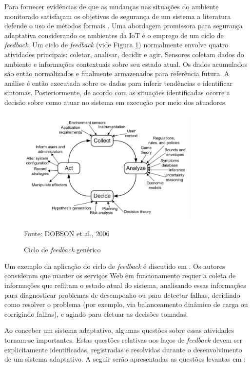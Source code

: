 \documentclass[tid,table]{texufpel} %
\begin{document}
Para fornecer evidências de que as mudanças nas situações do ambiente monitorado satisfaçam os objetivos de segurança de um sistema a literatura defende o uso de métodos formais \cite{lamprecht12, aman15}. Uma abordagem promissora para segurança adaptativa considerando os ambientes da IoT é o emprego de um ciclo de \textit{feedback}. Um ciclo de \textit{feedback} (vide Figura \ref{generic-feedback-loop}) normalmente envolve quatro atividades principais: coletar, analisar, decidir e agir. Sensores coletam dados do ambiente e informações contextuais sobre seu estado atual. Os dados acumulados são então normalizados e finalmente armazenados para referência futura.  A análise é então executada sobre os dados para inferir tendências e identificar sintomas. Posteriormente, de acordo com as situações identificadas ocorre a decisão sobre como atuar no sistema em execução por meio dos atuadores. 

\begin{figure}[ht]
\centering
\includegraphics[width=0.8\textwidth]{imagens/generic-feedback-loop.png}
\caption{Ciclo de \textit{feedback} genérico}
\label{generic-feedback-loop}
Fonte: DOBSON et al., 2006\nocite{dobson06}
\end{figure}

Um exemplo da aplicação do ciclo de \textit{feedback} é discutido em \cite{brun09}. Os autores consideram que manter os serviços Web em funcionamento requer a coleta de informações que reflitam o estado atual do sistema, analisando essas informações para diagnosticar problemas de desempenho ou para detectar falhas, decidindo como resolver o problema (por exemplo, via balanceamento dinâmico de carga ou corrigindo falhas), e agindo para efetuar as decisões tomadas.

Ao conceber um sistema adaptativo, algumas questões sobre essas atividades tornam-se importantes. Estas questões relativas aos laços de \textit{feedback} devem ser explicitamente identificadas, registradas e resolvidas durante o desenvolvimento de um sistema adaptativo. A seguir serão apresentadas as questões levantas em \cite{brun09, lamprecht12}:
\end{document}
